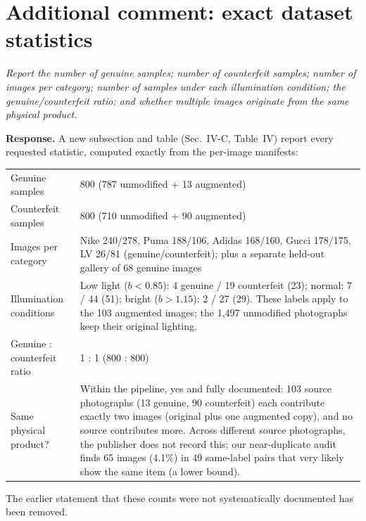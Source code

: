 \documentclass[10pt,a4paper]{article}
\newenvironment{comment}{\par\medskip\noindent\begin{minipage}{\linewidth}\color{black!70}\itshape}{\end{minipage}\par\smallskip}
\begin{document}
\section*{Additional comment: exact dataset statistics}

\begin{comment}Report the number of genuine samples; number of counterfeit samples; number of images per category; number of samples under each illumination condition; the genuine/counterfeit ratio; and whether multiple images originate from the same physical product.\end{comment}
\textbf{Response.} A new subsection and table (Sec.~IV-C, Table~IV) report every requested statistic, computed exactly from the per-image manifests:

\begin{tabularx}{\linewidth}{@{}lY@{}}
\toprule
Genuine samples & 800 (787 unmodified + 13 augmented) \\
Counterfeit samples & 800 (710 unmodified + 90 augmented) \\
Images per category & Nike 240/278, Puma 188/106, Adidas 168/160, Gucci 178/175, LV 26/81 (genuine/counterfeit); plus a separate held-out gallery of 68 genuine images \\
Illumination conditions & Low light ($b<0.85$): 4 genuine / 19 counterfeit (23); normal: 7 / 44 (51); bright ($b>1.15$): 2 / 27 (29). These labels apply to the 103 augmented images; the 1{,}497 unmodified photographs keep their original lighting. \\
Genuine : counterfeit ratio & 1 : 1 (800 : 800) \\
Same physical product? & Within the pipeline, yes and fully documented: 103 source photographs (13 genuine, 90 counterfeit) each contribute exactly two images (original plus one augmented copy), and no source contributes more. Across different source photographs, the publisher does not record this; our near-duplicate audit finds 65 images (4.1\%) in 49 same-label pairs that very likely show the same item (a lower bound). \\
\bottomrule
\end{tabularx}

The earlier statement that these counts were not systematically documented has been removed.
\end{document}
